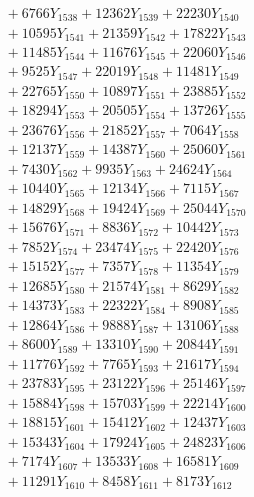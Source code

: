 \documentclass[a4paper,10pt]{article}
\begin{document}
{\begin{align}
&\;  + 6766 Y_{1538} + 12362 Y_{1539} + 22230 Y_{1540} \\[0.3ex]
&\;  + 10595 Y_{1541} + 21359 Y_{1542} + 17822 Y_{1543} \\[0.3ex]
&\;  + 11485 Y_{1544} + 11676 Y_{1545} + 22060 Y_{1546} \\[0.3ex]
&\;  + 9525 Y_{1547} + 22019 Y_{1548} + 11481 Y_{1549} \\[0.3ex]
&\;  + 22765 Y_{1550} + 10897 Y_{1551} + 23885 Y_{1552} \\[0.3ex]
&\;  + 18294 Y_{1553} + 20505 Y_{1554} + 13726 Y_{1555} \\[0.3ex]
&\;  + 23676 Y_{1556} + 21852 Y_{1557} + 7064 Y_{1558} \\[0.5ex]\allowbreak
&\;  + 12137 Y_{1559} + 14387 Y_{1560} + 25060 Y_{1561} \\[0.3ex]
&\;  + 7430 Y_{1562} + 9935 Y_{1563} + 24624 Y_{1564} \\[0.3ex]
&\;  + 10440 Y_{1565} + 12134 Y_{1566} + 7115 Y_{1567} \\[0.3ex]
&\;  + 14829 Y_{1568} + 19424 Y_{1569} + 25044 Y_{1570} \\[0.3ex]
&\;  + 15676 Y_{1571} + 8836 Y_{1572} + 10442 Y_{1573} \\[0.3ex]
&\;  + 7852 Y_{1574} + 23474 Y_{1575} + 22420 Y_{1576} \\[0.3ex]
&\;  + 15152 Y_{1577} + 7357 Y_{1578} + 11354 Y_{1579} \\[0.3ex]
&\;  + 12685 Y_{1580} + 21574 Y_{1581} + 8629 Y_{1582} \\[0.3ex]
&\;  + 14373 Y_{1583} + 22322 Y_{1584} + 8908 Y_{1585} \\[0.3ex]
&\;  + 12864 Y_{1586} + 9888 Y_{1587} + 13106 Y_{1588} \\[0.5ex]\allowbreak
&\;  + 8600 Y_{1589} + 13310 Y_{1590} + 20844 Y_{1591} \\[0.3ex]
&\;  + 11776 Y_{1592} + 7765 Y_{1593} + 21617 Y_{1594} \\[0.3ex]
&\;  + 23783 Y_{1595} + 23122 Y_{1596} + 25146 Y_{1597} \\[0.3ex]
&\;  + 15884 Y_{1598} + 15703 Y_{1599} + 22214 Y_{1600} \\[0.3ex]
&\;  + 18815 Y_{1601} + 15412 Y_{1602} + 12437 Y_{1603} \\[0.3ex]
&\;  + 15343 Y_{1604} + 17924 Y_{1605} + 24823 Y_{1606} \\[0.3ex]
&\;  + 7174 Y_{1607} + 13533 Y_{1608} + 16581 Y_{1609} \\[0.3ex]
&\;  + 11291 Y_{1610} + 8458 Y_{1611} + 8173 Y_{1612} \\[0.3ex]

\end{align}}
\end{document}
